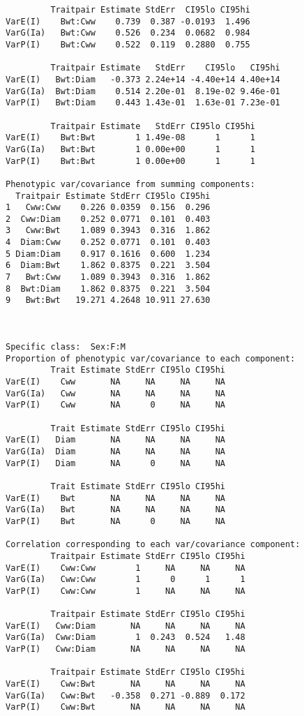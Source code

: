 \documentclass[titlepage]{article}  %
\begin{document}
\begin{verbatim}
         Traitpair Estimate StdErr  CI95lo CI95hi
VarE(I)    Bwt:Cww    0.739  0.387 -0.0193  1.496
VarG(Ia)   Bwt:Cww    0.526  0.234  0.0682  0.984
VarP(I)    Bwt:Cww    0.522  0.119  0.2880  0.755

         Traitpair Estimate   StdErr    CI95lo   CI95hi
VarE(I)   Bwt:Diam   -0.373 2.24e+14 -4.40e+14 4.40e+14
VarG(Ia)  Bwt:Diam    0.514 2.20e-01  8.19e-02 9.46e-01
VarP(I)   Bwt:Diam    0.443 1.43e-01  1.63e-01 7.23e-01

         Traitpair Estimate   StdErr CI95lo CI95hi
VarE(I)    Bwt:Bwt        1 1.49e-08      1      1
VarG(Ia)   Bwt:Bwt        1 0.00e+00      1      1
VarP(I)    Bwt:Bwt        1 0.00e+00      1      1

Phenotypic var/covariance from summing components:
  Traitpair Estimate StdErr CI95lo CI95hi
1   Cww:Cww    0.226 0.0359  0.156  0.296
2  Cww:Diam    0.252 0.0771  0.101  0.403
3   Cww:Bwt    1.089 0.3943  0.316  1.862
4  Diam:Cww    0.252 0.0771  0.101  0.403
5 Diam:Diam    0.917 0.1616  0.600  1.234
6  Diam:Bwt    1.862 0.8375  0.221  3.504
7   Bwt:Cww    1.089 0.3943  0.316  1.862
8  Bwt:Diam    1.862 0.8375  0.221  3.504
9   Bwt:Bwt   19.271 4.2648 10.911 27.630



Specific class:  Sex:F:M 
Proportion of phenotypic var/covariance to each component:
         Trait Estimate StdErr CI95lo CI95hi
VarE(I)    Cww       NA     NA     NA     NA
VarG(Ia)   Cww       NA     NA     NA     NA
VarP(I)    Cww       NA      0     NA     NA

         Trait Estimate StdErr CI95lo CI95hi
VarE(I)   Diam       NA     NA     NA     NA
VarG(Ia)  Diam       NA     NA     NA     NA
VarP(I)   Diam       NA      0     NA     NA

         Trait Estimate StdErr CI95lo CI95hi
VarE(I)    Bwt       NA     NA     NA     NA
VarG(Ia)   Bwt       NA     NA     NA     NA
VarP(I)    Bwt       NA      0     NA     NA

Correlation corresponding to each var/covariance component:
         Traitpair Estimate StdErr CI95lo CI95hi
VarE(I)    Cww:Cww        1     NA     NA     NA
VarG(Ia)   Cww:Cww        1      0      1      1
VarP(I)    Cww:Cww        1     NA     NA     NA

         Traitpair Estimate StdErr CI95lo CI95hi
VarE(I)   Cww:Diam       NA     NA     NA     NA
VarG(Ia)  Cww:Diam        1  0.243  0.524   1.48
VarP(I)   Cww:Diam       NA     NA     NA     NA

         Traitpair Estimate StdErr CI95lo CI95hi
VarE(I)    Cww:Bwt       NA     NA     NA     NA
VarG(Ia)   Cww:Bwt   -0.358  0.271 -0.889  0.172
VarP(I)    Cww:Bwt       NA     NA     NA     NA


\end{verbatim}
\end{document}
